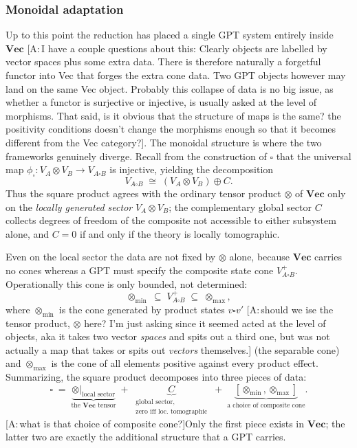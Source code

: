 \documentclass[prl,aps,10pt,superscriptaddress, floatfix]{revtex4-2}
\newcommand\al[1]{\textcolor{pansypurple}{ [A:\,#1]}}
\begin{document}
\subsubsection*{Monoidal adaptation}

Up to this point the reduction has placed a single GPT system entirely inside $\mathbf{Vec}$ \al{I have a couple questions about this: Clearly objects are labelled by vector spaces plus some extra data. There is therefore naturally a forgetful functor into Vec that forges the extra cone data. Two GPT objects however may land on the same Vec object. Probably this collapse of data is no big issue, as whether a functor is surjective or injective, is usually asked at the level of morphisms. That said, is it obvious that the structure of maps is the same? the positivity conditions doesn't change the morphisms enough so that it becomes different from the Vec category?}. The monoidal structure is where the two frameworks genuinely diverge. Recall from the construction of $\square$ that the universal map $\phi_\square:V_A\otimes V_B\to V_{A\square B}$ is injective, yielding the decomposition
\[
V_{A\square B}\;\cong\;(V_A\otimes V_B)\oplus C .
\]
Thus the square product agrees with the ordinary tensor product $\otimes$ of $\mathbf{Vec}$ only on the \emph{locally generated sector} $V_A\otimes V_B$; the complementary global sector $C$ collects degrees of freedom of the composite not accessible to either subsystem alone, and $C=0$ if and only if the theory is locally tomographic.

Even on the local sector the data are not fixed by $\otimes$ alone, because $\mathbf{Vec}$ carries no cones whereas a GPT must specify the composite state cone $V_{A\square B}^+$. Operationally this cone is only bounded, not determined:
\[
\otimes_{\min}\;\subseteq\;V_{A\square B}^+\;\subseteq\;\otimes_{\max},
\]
where $\otimes_{\min}$ is the cone generated by product states $v\square v'$ \al{should we ise the tensor product, $\otimes$ here? I'm just asking since it seemed acted at the level of objects, aka it takes two vector \textit{spaces} and spits out a third one, but was not actually a map that takes or spits out \textit{vectors} themselves.} (the separable cone) and $\otimes_{\max}$ is the cone of all elements positive against every product effect. Summarizing, the square product decomposes into three pieces of data:
\[
\square\;=\;\underbrace{\otimes\big|_{\text{local sector}}}_{\text{the }\mathbf{Vec}\text{ tensor}}\;+\;\underbrace{C}_{\substack{\text{global sector,}\\ \text{zero iff loc.\ tomographic}}}\;+\;\underbrace{[\otimes_{\min},\otimes_{\max}]}_{\text{a choice of composite cone}} .
\]
\al{what is that choice of composite cone?}Only the first piece exists in $\mathbf{Vec}$; the latter two are exactly the additional structure that a GPT carries.
\end{document}
